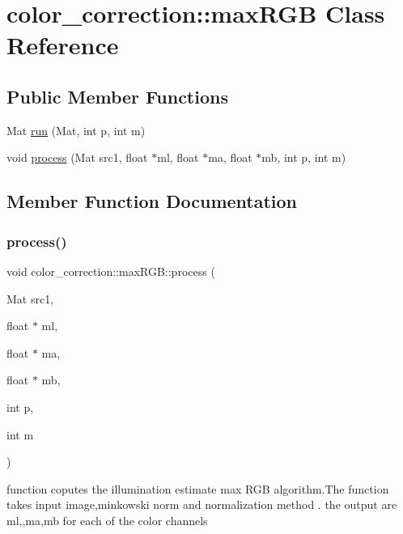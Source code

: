 \hypertarget{classcolor__correction_1_1maxRGB}{}\section{color\+\_\+correction\+:\+:max\+R\+GB Class Reference}
\label{classcolor__correction_1_1maxRGB}
\subsection*{Public Member Functions}
\begin{DoxyCompactItemize}
\item 
Mat \hyperlink{classcolor__correction_1_1maxRGB_acf7ab1043e266c02f54d83b8c5625284}{run} (Mat, int p, int m)
\item 
void \hyperlink{classcolor__correction_1_1maxRGB_a7da874962b27949e521c065d56354264}{process} (Mat src1, float $\ast$ml, float $\ast$ma, float $\ast$mb, int p, int m)
\end{DoxyCompactItemize}


\subsection{Member Function Documentation}
\mbox{\label{classcolor__correction_1_1maxRGB_a7da874962b27949e521c065d56354264}} 
\subsubsection{\texorpdfstring{process()}{process()}}
{\footnotesize\ttfamily void color\+\_\+correction\+::max\+R\+G\+B\+::process (\begin{DoxyParamCaption}\item[{Mat}]{src1,  }\item[{float $\ast$}]{ml,  }\item[{float $\ast$}]{ma,  }\item[{float $\ast$}]{mb,  }\item[{int}]{p,  }\item[{int}]{m }\end{DoxyParamCaption})}

function coputes the illumination estimate max R\+GB algorithm.\+The function takes input image,minkowski norm and normalization method . the output are ml,,ma,mb for each of the color channels \mbox{\label{classcolor__correction_1_1maxRGB_acf7ab1043e266c02f54d83b8c5625284}} 
